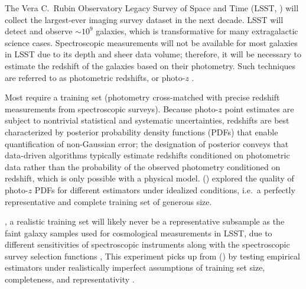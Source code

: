\documentclass[fleqn,usenatbib,useAMS]{mnras}
\newcommand{\citeDCt}{\citetalias{Schmidt20} (\citeyear{Schmidt20})\xspace}
\newcommand{\refresponse}[1]{{\color{black}{#1}}}
\newcommand{\revone}[2]{{\color{black}{#2}}}
\newcommand{\cwr}[1]{{\color{black}{#1}}}
\begin{document}
The Vera C.~Rubin Observatory Legacy Survey of Space and Time (LSST, \citealt{ivezic2019}) will collect the largest-ever imaging survey dataset in the next decade. LSST will detect and observe $\sim 10^{9}$ galaxies\revone{ in the universe}{}, which is transformative for many extragalactic science cases. 
Spectroscopic measurements will not be available for most galaxies in LSST due to its depth and sheer data volume; 
therefore, it will be necessary to estimate the redshift of the galaxies based on their photometry. 
Such techniques are referred to as photometric redshifts, or photo-$z$ \citep[for a review, see][]{2019NatAs...3..212S,2022ARA&A..60..363N}. 

Most \refresponse{data-driven photo-$z$ algorithms} require a training set (photometry cross-matched with precise redshift measurements from spectroscopic surveys). 
Because photo-$z$ point estimates are subject to nontrivial statistical and systematic uncertainties, redshifts are best characterized by posterior probability density functions (PDFs) that enable quantification of non-Gaussian error;
the designation of posterior conveys that data-driven algorithms typically estimate redshifts conditioned on photometric data rather than the probability of the observed photometry conditioned on redshift, which is only possible with a physical model.
\citeDCt explored the quality of photo-$z$ PDFs for different estimators under idealized conditions, i.e.~a perfectly representative and complete training set of generous size\revone{}{ yet nonetheless uncovered several major areas for improvement in the field of photo-$z$}. 

\revone{However}{Most obviously}, a realistic training set will likely never be a representative subsample as the faint galaxy samples used for cosmological measurements in LSST, due to different sensitivities of spectroscopic instruments along with the spectroscopic survey selection functions \citep{Stylianou22}, \refresponse{and the specific training set conditions to which various estimation algorithms are sensitive or performant is not yet adequately understood. } \cwr{The mismatch between the training set and the photometric sample to which the photometric redshift estimators are to be applied induces a statistical effect known as `covariate shift'.} 
This experiment picks up from \citeDCt by testing empirical estimators under realistically imperfect assumptions of training set size, completeness, and representativity \cwr{to assess their sensitivity to this covariate shift}.
\end{document}
